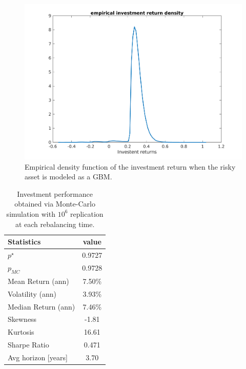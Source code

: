 \begin{figure}[H]
	\includegraphics[scale = 0.4]{Images/Densityext1}
	\caption{Empirical density function of the investment return when the risky asset is modeled as a \gls{GBM}.}
	\label{fig:ext1_investment_return}
\end{figure}
\begin{table}
		\begin{tabular}{@{}lc@{}}
			\toprule
			Statistics & value  \\
			\midrule
			$p^{\star}$ & 0.9727\\
			\addlinespace[0.5em]	
			$p_{MC}$ & 0.9728\\
			\addlinespace[0.5em]
			Mean Return (ann) & 7.50\%\\
			\addlinespace[0.5em]
			Volatility (ann) & 3.93\%\\
			\addlinespace[0.5em]
			Median Return (ann) & 7.46\%\\
			\addlinespace[0.5em]
			Skewness & -1.81\\
			\addlinespace[0.5em]
			Kurtosis & 16.61\\
			\addlinespace[0.5em]
			Sharpe Ratio & 0.471\\
			\addlinespace[0.5em]
			Avg horizon [years] & 3.70 \\	
			\bottomrule
		\end{tabular}
		\caption{Investment performance obtained via Monte-Carlo simulation with $10^6$ replication at each rebalancing time.}
		\label{tab:performance_ext1}
\end{table}

